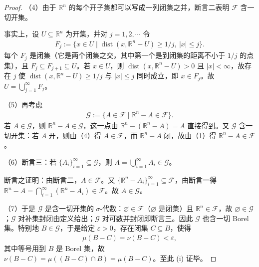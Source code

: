 \documentclass[../../main.tex]{subfiles}
\begin{document}
\begin{proof}
（4）由于 $\mathbb{R}^{n}$ 的每个开子集都可以写成一列闭集之并，断言二表明 $\mathcal{F}$ 含一切开集。

事实上，设 $U\subseteq\mathbb{R}^{n}$ 为开集，并对 $j=1,2,\cdots$ 令
\begin{align*}
F_{j}:=\{x\in U\mid\operatorname{dist}(x,\mathbb{R}^{n}-U)\geqslant 1/j,\ |x|\leqslant j\}.
\end{align*}
每个 $F_{j}$ 是闭集（它是两个闭集之交，其中第一个是到闭集的距离不小于 $1/j$ 的点集），且 $F_{j}\subseteq F_{j+1}\subseteq U$。若 $x\in U$，则 $\operatorname{dist}(x,\mathbb{R}^{n}-U)>0$ 且 $|x|<\infty$，故存在 $j$ 使 $\operatorname{dist}(x,\mathbb{R}^{n}-U)\geqslant1/j$ 与 $|x|\leqslant j$ 同时成立，即 $x\in F_{j}$。故 $U=\bigcup_{j=1}^{\infty}F_{j}$。

（5）再考虑
\begin{align*}
\mathcal{G}:=\{A\in\mathcal{F}\mid\mathbb{R}^{n}-A\in\mathcal{F}\}.
\end{align*}
若 $A\in\mathcal{G}$，则 $\mathbb{R}^{n}-A\in\mathcal{G}$，这一点由 $\mathbb{R}^{n}-(\mathbb{R}^{n}-A)=A$ 直接得到。又 $\mathcal{G}$ 含一切开集：若 $A$ 开，则由（4）得 $A\in\mathcal{F}$，而 $\mathbb{R}^{n}-A$ 闭，故由（1）得 $\mathbb{R}^{n}-A\in\mathcal{F}$。

（6）断言三：若 $\{A_{i}\}_{i=1}^{\infty}\subseteq\mathcal{G}$，则 $A=\bigcup_{i=1}^{\infty}A_{i}\in\mathcal{G}$。

断言之证明：由断言二，$A\in\mathcal{F}$。又 $\{\mathbb{R}^{n}-A_{i}\}_{i=1}^{\infty}\subseteq\mathcal{F}$，由断言一得 $\mathbb{R}^{n}-A=\bigcap_{i=1}^{\infty}(\mathbb{R}^{n}-A_{i})\in\mathcal{F}$。故 $A\in\mathcal{G}$。

（7）于是 $\mathcal{G}$ 是含一切开集的 $\sigma$-代数：$\varnothing\in\mathcal{F}$（$\varnothing$ 是闭集）且 $\mathbb{R}^{n}\in\mathcal{F}$，故 $\varnothing\in\mathcal{G}$；$\mathcal{G}$ 对补集封闭由定义给出；$\mathcal{G}$ 对可数并封闭即断言三。因此 $\mathcal{G}$ 也含一切 Borel 集。特别地 $B\in\mathcal{G}$，于是给定 $\varepsilon>0$，存在闭集 $C\subseteq B$，使得
\begin{align*}
\mu(B-C)=\nu(B-C)<\varepsilon,
\end{align*}
其中等号用到 $B$ 是 Borel 集，故 $\nu(B-C)=\mu((B-C)\cap B)=\mu(B-C)$。至此 (i) 证毕。


\end{proof}
\end{document}
